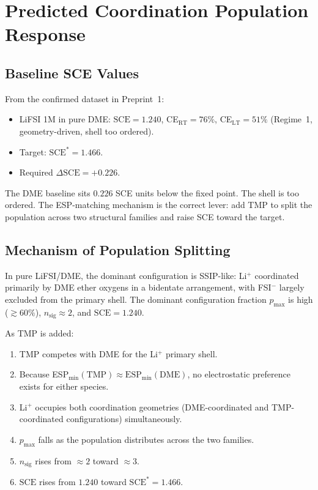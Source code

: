 \documentclass[11pt]{article}
\theoremstyle{plain}
\theoremstyle{definition}
\theoremstyle{remark}
\begin{document}
\section{Predicted Coordination Population Response}
\label{sec:population}

\subsection{Baseline SCE Values}

From the confirmed dataset in Preprint~1:

\begin{itemize}[leftmargin=2em]
  \item LiFSI 1M in pure DME: $\mathrm{SCE} = 1.240$,
        CE$_{\mathrm{RT}} = 76\%$, CE$_{\mathrm{LT}} = 51\%$
        (Regime~1, geometry-driven, shell too ordered).
  \item Target: $\mathrm{SCE}^{*} = 1.466$.
  \item Required $\Delta\mathrm{SCE} = +0.226$.
\end{itemize}

The DME baseline sits $0.226$ SCE units below the fixed point.  The shell
is too ordered.  The ESP-matching mechanism is the correct lever: add TMP
to split the population across two structural families and raise SCE toward
the target.

\subsection{Mechanism of Population Splitting}

In pure LiFSI/DME, the dominant configuration is SSIP-like: Li$^+$
coordinated primarily by DME ether oxygens in a bidentate arrangement,
with FSI$^-$ largely excluded from the primary shell.  The dominant
configuration fraction $p_{\max}$ is high ($\gtrsim 60\%$), $n_{\mathrm{sig}}
\approx 2$, and $\mathrm{SCE} = 1.240$.

As TMP is added:
\begin{enumerate}[leftmargin=2em]
  \item TMP competes with DME for the Li$^+$ primary shell.
  \item Because ESP$_{\min}(\mathrm{TMP}) \approx \mathrm{ESP}_{\min}(\mathrm{DME})$,
        no electrostatic preference exists for either species.
  \item Li$^+$ occupies both coordination geometries (DME-coordinated and
        TMP-coordinated configurations) simultaneously.
  \item $p_{\max}$ falls as the population distributes across the two
        families.
  \item $n_{\mathrm{sig}}$ rises from $\approx 2$ toward $\approx 3$.
  \item $\mathrm{SCE}$ rises from $1.240$ toward $\mathrm{SCE}^{*} = 1.466$.
\end{enumerate}
\end{document}
